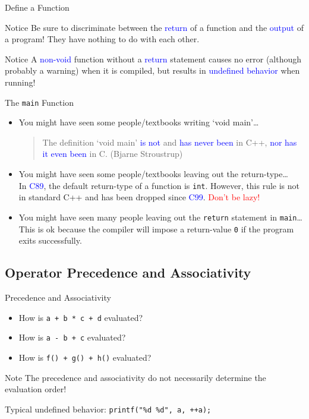 \documentclass[handout]{beamer}
\newcommand{\red}[1]{\textcolor{red}{#1}}
\newcommand{\blue}[1]{\textcolor{blue}{#1}}
\begin{document}
\begin{frame}{Define a Function}
    \begin{alertblock}{Notice}
        Be sure to discriminate between the \blue{return} of a function and the \blue{output} of a program! They have nothing to do with each other.
    \end{alertblock}
    \pause
    \begin{alertblock}{Notice}
        A \blue{non-void} function without a \blue{return} statement causes no error (although probably a warning) when it is compiled, but results in \blue{undefined behavior} when running!
    \end{alertblock}
\end{frame}

\begin{frame}{The \texttt{main} Function}
    \begin{itemize}
        \item You might have seen some people/textbooks writing `void main'\dots\\[0.7em]
        \pause
        \begin{quote}
            The definition `void main' \blue{is not} and \blue{has never been} in C++, \blue{nor has it even been} in C. (Bjarne Stroustrup)
        \end{quote}
        \pause
        \item You might have seen some people/textbooks leaving out the return-type\dots\\[0.7em]
        \pause
        In \blue{C89}, the default return-type of a function is \texttt{int}. However, this rule is not in standard C++ and has been dropped since \blue{C99}. \red{Don't be lazy!}
        \pause
        \item You might have seen many people leaving out the \texttt{return} statement in \texttt{main}\dots\\[0.7em]
        \pause
        This is ok because the compiler will impose a return-value \texttt{0} if the program exits successfully.
    \end{itemize}
\end{frame}

\subsection{Operator Precedence and Associativity}

\begin{frame}{Precedence and Associativity}
    \begin{itemize}
        \item How is \texttt{a + b * c + d} evaluated?
        \item How is \texttt{a - b + c} evaluated?
        \item How is \texttt{f() + g() + h()} evaluated?
    \end{itemize}
    \pause
    \begin{alertblock}{Note}
        The precedence and associativity do not necessarily determine the evaluation order!
    \end{alertblock}
    \pause
    Typical undefined behavior: \texttt{printf("\%d \%d", a, ++a);}
\end{frame}
\end{document}

